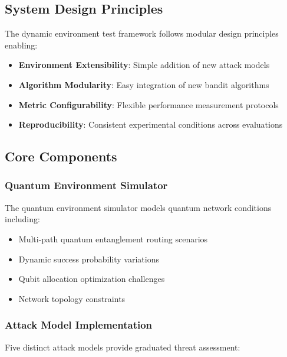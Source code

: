 \documentclass[11pt,a4paper]{article}
\begin{document}
\subsection{System Design Principles}

The dynamic environment test framework follows modular design principles enabling:

\begin{itemize}
\item \textbf{Environment Extensibility}: Simple addition of new attack models
\item \textbf{Algorithm Modularity}: Easy integration of new bandit algorithms
\item \textbf{Metric Configurability}: Flexible performance measurement protocols
\item \textbf{Reproducibility}: Consistent experimental conditions across evaluations
\end{itemize}

\subsection{Core Components}

\subsubsection{Quantum Environment Simulator}

The quantum environment simulator models quantum network conditions including:

\begin{itemize}
\item Multi-path quantum entanglement routing scenarios
\item Dynamic success probability variations
\item Qubit allocation optimization challenges
\item Network topology constraints
\end{itemize}

\subsubsection{Attack Model Implementation}

Five distinct attack models provide graduated threat assessment:
\end{document}
